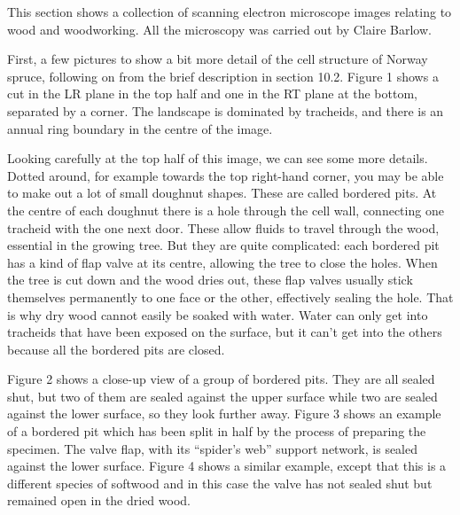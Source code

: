   This section shows a collection of scanning electron microscope images 
  relating to wood and woodworking. All the microscopy was carried out by 
  Claire Barlow. 

  First, a few pictures to show a bit more detail of the cell structure of 
  Norway spruce, following on from the brief description in section 10.2. 
  Figure 1 shows a cut in the LR plane in the top half and one in the RT plane 
  at the bottom, separated by a corner. The landscape is dominated by 
  tracheids, and there is an annual ring boundary in the centre of the image. 


  Looking carefully at the top half of this image, we can see some more 
  details. Dotted around, for example towards the top right-hand corner, you 
  may be able to make out a lot of small doughnut shapes. These are called 
  bordered pits. At the centre of each doughnut there is a hole through the 
  cell wall, connecting one tracheid with the one next door. These allow fluids 
  to travel through the wood, essential in the growing tree. But they are quite 
  complicated: each bordered pit has a kind of flap valve at its centre, 
  allowing the tree to close the holes. When the tree is cut down and the wood 
  dries out, these flap valves usually stick themselves permanently to one face 
  or the other, effectively sealing the hole. That is why dry wood cannot 
  easily be soaked with water. Water can only get into tracheids that have been 
  exposed on the surface, but it can’t get into the others because all the 
  bordered pits are closed. 

  Figure 2 shows a close-up view of a group of bordered pits. They are all 
  sealed shut, but two of them are sealed against the upper surface while two 
  are sealed against the lower surface, so they look further away. Figure 3 
  shows an example of a bordered pit which has been split in half by the 
  process of preparing the specimen. The valve flap, with its ``spider's web'' 
  support network, is sealed against the lower surface. Figure 4 shows a 
  similar example, except that this is a different species of softwood and in 
  this case the valve has not sealed shut but remained open in the dried wood. 


